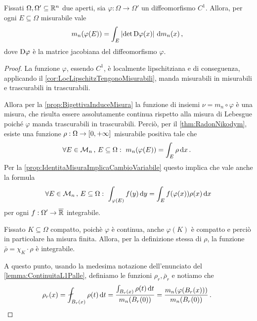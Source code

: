 \begin{lemma}\label{lemma:MisuraImmagine}
	Fissati $\Omega,\Omega'\subseteq\mathbb R^n$ due aperti, sia $\varphi:\Omega\to\Omega'$ un diffeomorfismo $C^1$.
	Allora, per ogni $E\subseteq \Omega$ misurabile vale
	\begin{equation*}
		m_n(\varphi(E))=\int_E\left\lvert \det \mathrm D \varphi(x) \right\rvert \,\mathrm d m_n(x)\, \text{, }
	\end{equation*}
	dove $\mathrm D \varphi$ è la matrice jacobiana del diffeomorfismo $\varphi$.
\end{lemma}
\begin{proof}
	La funzione $\varphi$, essendo $C^1$, è localmente lipschitziana e di conseguenza, applicando il \cref{cor:LocLipschitzTengonoMisurabili}, manda misurabili in misurabili e trascurabili in trascurabili.
	
	Allora per la \cref{prop:BigettivaInduceMisura} la funzione di insiemi $\nu=m_n\circ \varphi$ è una misura, che risulta essere assolutamente continua rispetto alla misura di Lebesgue poiché $\varphi$ manda trascurabili in trascurabili.
	Perciò, per il \cref{thm:RadonNikodym}, esiste una funzione $\rho:\Omega\to[0,+\infty]$ misurabile positiva tale che
	\begin{equation*}
		\forall E\in \mathcal M_n\, \text{, } E\subseteq \Omega:\ m_n(\varphi(E))=\int_E \rho \,\mathrm d x \, \text{. }
	\end{equation*}
	Per la \cref{prop:IdentitaMisuraImplicaCambioVariabile} questo implica che vale anche la formula
	\begin{equation}\label{eq:CambioRadonNikodym}
		\forall E\in \mathcal M_n\, \text{, } E\subseteq\Omega:\ \int_{\varphi(E)} f(y)\,\mathrm d y = \int_{E} f(\varphi(x))\rho(x) \,\mathrm d x
	\end{equation}
	per ogni $f:\Omega'\to\overline{\mathbb R}$ integrabile.
	
	Fissato $K\subseteq\Omega$ compatto, poichè $\varphi$ è continua, anche $\varphi(K)$ è compatto e perciò in particolare ha misura finita.
	Allora, per la definizione stessa di $\rho$, la funzione $\bar\rho=\chi_K\cdot\rho$ è integrabile.
	
	A questo punto, usando la medesima notazione dell'enunciato del \cref{lemma:ContinuitaL1Palle}, definiamo le funzioni $\rho_r, \bar\rho_r$ e notiamo che
	\begin{equation*}
		\rho_r(x)=\aint_{B_r(x)}\rho(t)\de t=\frac{\int_{B_r(x)} \rho(t)\de t}{m_n(B_r(0))}=\frac{m_n(\varphi(B_r(x)))}{m_n(B_r(0))}\punto
	\end{equation*}
	

\end{proof}
